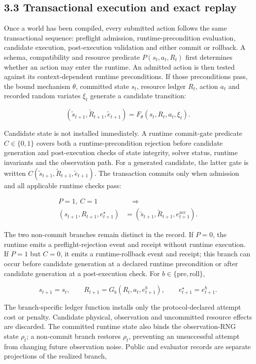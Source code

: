 \documentclass[10pt,twocolumn]{article}
\begin{document}
\subsection{3.3 Transactional execution and exact
replay}\label{transactional-execution-and-exact-replay}

Once a world has been compiled, every submitted action follows the same
transactional sequence: preflight admission, runtime-precondition
evaluation, candidate execution, post-execution validation and either
commit or rollback. A schema, compatibility and resource predicate
\(P(s_t,a_t,R_t)\) first determines whether an action may enter the
runtime. An admitted action is then tested against its context-dependent
runtime preconditions. If those preconditions pass, the bound mechanism
\(\theta\), committed state \(s_t\), resource ledger \(R_t\), action
\(a_t\) and recorded random variates \(\xi_t\) generate a candidate
transition:

\[
(\tilde{s}_{t+1},\tilde{R}_{t+1},\tilde{e}_{t+1})=
F_\theta(s_t,R_t,a_t,\xi_t).
\]

Candidate state is not installed immediately. A runtime commit-gate
predicate \(C\in\{0,1\}\) covers both a runtime-precondition rejection
before candidate generation and post-execution checks of state
integrity, solver status, runtime invariants and the observation path.
For a generated candidate, the latter gate is written
\(C(\tilde{s}_{t+1},\tilde{R}_{t+1},\tilde{e}_{t+1})\). The transaction
commits only when admission and all applicable runtime checks pass:

\[
\begin{aligned}
P=1,\ C=1 &\quad\Longrightarrow\\[-0.15em]
(s_{t+1},R_{t+1},e^\star_{t+1})
&=(\tilde{s}_{t+1},\tilde{R}_{t+1},e^{\mathrm{acc}}_{t+1}).
\end{aligned}
\]

The two non-commit branches remain distinct in the record. If \(P=0\),
the runtime emits a preflight-rejection event and receipt without
runtime execution. If \(P=1\) but \(C=0\), it emits a runtime-rollback
event and receipt; this branch can occur before candidate generation at
a declared runtime precondition or after candidate generation at a
post-execution check. For \(b\in\{\mathrm{pre},\mathrm{roll}\}\),

\[
s_{t+1}=s_t,\qquad
R_{t+1}=G_b(R_t,a_t,e^b_{t+1}),\qquad
e^\star_{t+1}=e^b_{t+1}.
\]

The branch-specific ledger function installs only the protocol-declared
attempt cost or penalty. Candidate physical, observation and uncommitted
resource effects are discarded. The committed runtime state also binds
the observation-RNG state \(\rho_t\); a non-commit branch restores
\(\rho_t\), preventing an unsuccessful attempt from changing future
observation noise. Public and evaluator records are separate projections
of the realized branch,
\end{document}
